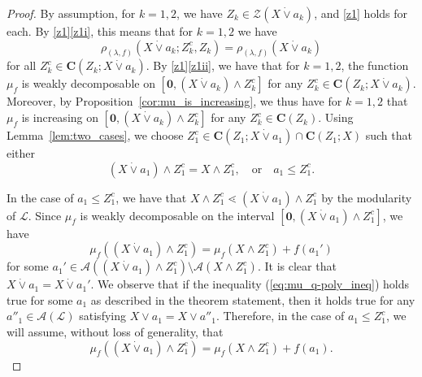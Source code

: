 \documentclass[a4paper,11pt,reqno]{article}
\theoremstyle{definition}
\newcommand{\zero}{{\mathbf{0}}}
\begin{document}
\begin{proof}    
    By assumption, for \( k = 1, 2 \), we have \( Z_k \in \mathcal{Z}(X \dot\vee a_k) \), and \ref{z1} holds for each. By \ref{z1}\ref{z1i}, this means that for $k=1,2$ we have
\[
\rho_{(\lambda, f)}(X \dot\vee a_k; Z_k^c, Z_k) = \rho_{(\lambda, f)}(X \dot\vee a_k)
\]
for all \( Z_k^c \in \textbf{C}(Z_k; X \dot\vee a_k) \). By \ref{z1}\ref{z1ii}, we have that for $k=1,2$, the function $\mu_f$ is weakly decomposable on $[\zero,(X\dot\vee a_k)\wedge Z_k^c]$ for any $Z_k^c\in\mathbf{C}(Z_k;X\dot\vee a_k)$. Moreover, by Proposition~\ref{cor:mu_is_increasing}, we thus have for $k=1,2$ that $\mu_f$ is increasing on $[\zero,(X\dot\vee a_k)\wedge Z_k^c]$ for any $Z_k^c\in\mathbf{C}(Z_k)$. Using Lemma~\ref{lem:two_cases}, we choose \( Z_1^c \in \mathbf{C}(Z_1; X \dot\vee a_1) \cap \mathbf{C}(Z_1; X) \) such that either
\begin{equation}\label{eq:Z_1^c_either_or}
    (X \dot\vee a_1) \wedge Z_1^c = X \wedge Z_1^c, \quad \text{or} \quad a_1 \leq Z_1^c.
\end{equation}

In the case of $a_1\leq Z_1^c$, we have that $X\wedge Z_1^c\lessdot(X\dot\vee a_1)\wedge Z_1^c$ by the modularity of $\mathcal{L}$. Since $\mu_f$ is weakly decomposable on the interval $[\zero,(X\dot\vee a_1)\wedge Z_1^c]$, we have
\begin{equation*}
    \mu_f((X\dot\vee a_1)\wedge Z_1^c)=\mu_f(X\wedge Z_1^c)+f(a_1')
\end{equation*} 
for some $a_1'\in\mathcal{A}((X\dot\vee a_1)\wedge Z_1^c)\setminus\mathcal{A}(X\wedge Z_1^c)$. It is clear that $X\dot\vee a_1=X\dot\vee a_1'$. We observe that if the inequality (\ref{eq:mu_q-poly_ineq}) holds true for some $a_1$ as described in the theorem statement, then it holds true for any $a''_1\in\mathcal{A}(\mathcal{L})$ satisfying $X \vee a_1=X \vee a''_1$. Therefore, in the case of $a_1\leq Z_1^c$, we will assume, without loss of generality, that
\begin{equation}\label{eq:a_1_fix}
    \mu_f((X\dot\vee a_1)\wedge Z_1^c)=\mu_f(X\wedge Z_1^c)+f(a_1).
\end{equation} 


\end{proof}
\end{document}

